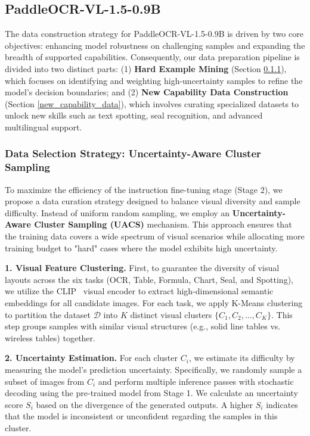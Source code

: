 \documentclass[11pt, a4paper,logo,  copyright, nonumbering]{paddleocr}
\begin{document}
\subsection{PaddleOCR-VL-1.5-0.9B}


The data construction strategy for PaddleOCR-VL-1.5-0.9B is driven by two core objectives: enhancing model robustness on challenging samples and expanding the breadth of supported capabilities. Consequently, our data preparation pipeline is divided into two distinct parts: 
(1) \textbf{Hard Example Mining} (Section \ref{hard_example_mining}), which focuses on identifying and weighting high-uncertainty samples to refine the model's decision boundaries; and 
(2) \textbf{New Capability Data Construction} (Section \ref{new_capability_data}), which involves curating specialized datasets to unlock new skills such as text spotting, seal recognition, and advanced multilingual support.

\subsubsection{Data Selection Strategy: Uncertainty-Aware Cluster Sampling}
\label{hard_example_mining}

To maximize the efficiency of the instruction fine-tuning stage (Stage 2), we propose a data curation strategy designed to balance visual diversity and sample difficulty. Instead of uniform random sampling, we employ an \textbf{Uncertainty-Aware Cluster Sampling (UACS)} mechanism. This approach ensures that the training data covers a wide spectrum of visual scenarios while allocating more training budget to "hard" cases where the model exhibits high uncertainty.

\textbf{1. Visual Feature Clustering.} 
First, to guarantee the diversity of visual layouts across the six tasks (OCR, Table, Formula, Chart, Seal, and Spotting), we utilize the CLIP~\cite{radford2021learning} visual encoder to extract high-dimensional semantic embeddings for all candidate images. For each task, we apply K-Means clustering to partition the dataset $\mathcal{D}$ into $K$ distinct visual clusters $\{C_1, C_2, \dots, C_K\}$. This step groups samples with similar visual structures (e.g., solid line tables vs. wireless tables) together.

\textbf{2. Uncertainty Estimation.}
For each cluster $C_i$, we estimate its difficulty by measuring the model's prediction uncertainty. Specifically, we randomly sample a subset of images from $C_i$ and perform multiple inference passes with stochastic decoding using the pre-trained model from Stage 1. We calculate an uncertainty score $S_i$ based on the divergence of the generated outputs. A higher $S_i$ indicates that the model is inconsistent or unconfident regarding the samples in this cluster.
\end{document}
